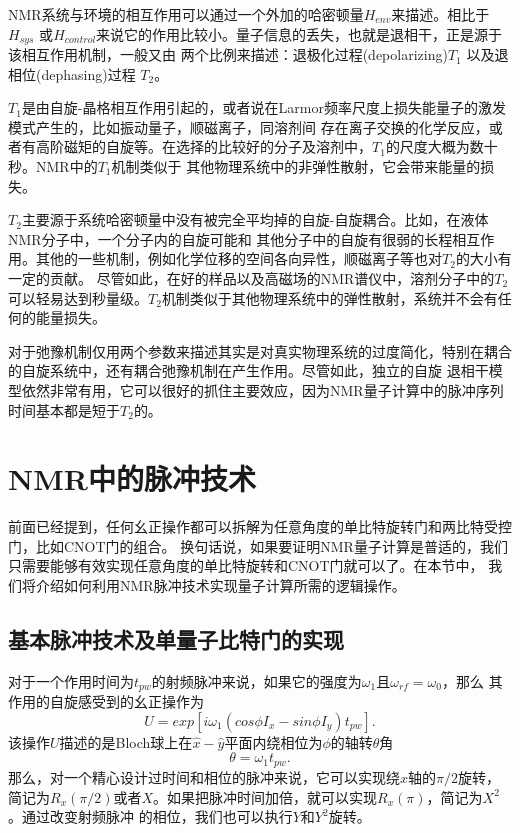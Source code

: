 NMR系统与环境的相互作用可以通过一个外加的哈密顿量$H_{env}$来描述。相比于$H_{sys}$ 或$H_{control}$来说它的作用比较小。量子信息的丢失，也就是退相干，正是源于该相互作用机制，一般又由
两个比例来描述：退极化过程(depolarizing)$T_1$ 以及退相位(dephasing)过程 $T_2$。

$T_1$是由自旋-晶格相互作用引起的，或者说在Larmor频率尺度上损失能量子的激发模式产生的，比如振动量子，顺磁离子，同溶剂间
存在离子交换的化学反应，或者有高阶磁矩的自旋等。在选择的比较好的分子及溶剂中，$T_1$的尺度大概为数十秒。NMR中的$T_1$机制类似于
其他物理系统中的非弹性散射，它会带来能量的损失。

$T_2$主要源于系统哈密顿量中没有被完全平均掉的自旋-自旋耦合。比如，在液体NMR分子中，一个分子内的自旋可能和
其他分子中的自旋有很弱的长程相互作用。其他的一些机制，例如化学位移的空间各向异性，顺磁离子等也对$T_2$的大小有一定的贡献。
尽管如此，在好的样品以及高磁场的NMR谱仪中，溶剂分子中的$T_2$可以轻易达到秒量级。$T_2$机制类似于其他物理系统中的弹性散射，系统并不会有任何的能量损失。

对于弛豫机制仅用两个参数来描述其实是对真实物理系统的过度简化，特别在耦合的自旋系统中，还有耦合弛豫机制在产生作用\cite{relax1,relax2}。尽管如此，独立的自旋
退相干模型依然非常有用，它可以很好的抓住主要效应，因为NMR量子计算中的脉冲序列时间基本都是短于$T_2$的。

\section{NMR中的脉冲技术}

前面已经提到，任何幺正操作都可以拆解为任意角度的单比特旋转门和两比特受控门，比如CNOT门的组合。
换句话说，如果要证明NMR量子计算是普适的，我们只需要能够有效实现任意角度的单比特旋转和CNOT门就可以了。在本节中，
我们将介绍如何利用NMR脉冲技术实现量子计算所需的逻辑操作。

\subsection{基本脉冲技术及单量子比特门的实现}

对于一个作用时间为$t_{pw}$的射频脉冲来说，如果它的强度为$\omega_1$且$\omega_{rf}=\omega_0$，那么
其作用的自旋感受到的幺正操作为
\begin{equation}\label{aaa}
U =exp[i\omega_1 (cos \phi I_x- sin \phi I_y)t_{pw}].
\end{equation}
该操作$U$描述的是Bloch球上在$\hat{x}-\hat{y}$平面内绕相位为$\phi$的轴转$\theta$角
\begin{equation}\label{aaa}
\theta =\omega_1 t_{pw}.
\end{equation}
那么，对一个精心设计过时间和相位的脉冲来说，它可以实现绕$\hat{x}$轴的$\pi /2$旋转，简记为$R_x(\pi/2)$或者$X$。如果把脉冲时间加倍，就可以实现$R_x(\pi)$，简记为$X^2$。通过改变射频脉冲
的相位，我们也可以执行$Y$和$Y^2$旋转。

